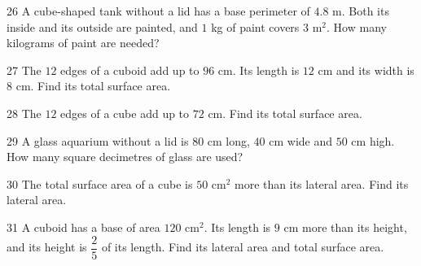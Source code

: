 \gap
\begin{probbox}{26}{\relax}
A cube-shaped tank without a lid has a base perimeter of $4.8$ m. Both its inside and its outside are painted, and $1$ kg of paint covers $3$ m$^2$. How many kilograms of paint are needed?
\end{probbox}
\gap
\begin{probbox}{27}{\relax}
The $12$ edges of a cuboid add up to $96$ cm. Its length is $12$ cm and its width is $8$ cm. Find its total surface area.
\end{probbox}
\gap
\begin{probbox}{28}{\relax}
The $12$ edges of a cube add up to $72$ cm. Find its total surface area.
\end{probbox}
\gap
\begin{probbox}{29}{\relax}
A glass aquarium without a lid is $80$ cm long, $40$ cm wide and $50$ cm high. How many square decimetres of glass are used?
\end{probbox}
\gap
\begin{probbox}{30}{\relax}
The total surface area of a cube is $50$ cm$^2$ more than its lateral area. Find its lateral area.
\end{probbox}
\begin{probbox}{31}{}
A cuboid has a base of area $120$ cm$^2$. Its length is $9$ cm more than its height, and its height is $\dfrac25$ of its length. Find its lateral area and total surface area.
\end{probbox}

